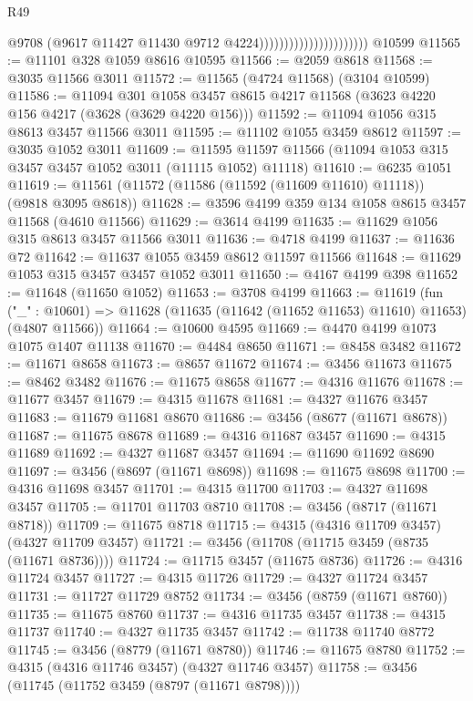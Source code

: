 \begin{lexlean}{R49}
\begin{coremodule}
                                              @9708
                                              (@9617 @11427 @11430 @9712 @4224))))))))))))))))))))))
    @10599
@11565 := @11101 @328 @1059 @8616 @10595
@11566 := @2059 @8618
@11568 := @3035 @11566 @3011
@11572 := @11565 (@4724 @11568) (@3104 @10599)
@11586 := @11094
    @301
    @1058
    @3457
    @8615
    @4217
    @11568
    (@3623 @4220 @156 @4217 (@3628 (@3629 @4220 @156)))
@11592 := @11094 @1056 @315 @8613 @3457 @11566 @3011
@11595 := @11102 @1055 @3459 @8612
@11597 := @3035 @1052 @3011
@11609 := @11595 @11597 @11566 (@11094 @1053 @315 @3457 @3457 @1052 @3011 (@11115 @1052) @11118)
@11610 := @6235 @1051
@11619 := @11561 (@11572 (@11586 (@11592 (@11609 @11610) @11118)) (@9818 @3095 @8618))
@11628 := @3596 @4199 @359 @134 @1058 @8615 @3457 @11568 (@4610 @11566)
@11629 := @3614 @4199
@11635 := @11629 @1056 @315 @8613 @3457 @11566 @3011
@11636 := @4718 @4199
@11637 := @11636 @72
@11642 := @11637 @1055 @3459 @8612 @11597 @11566
@11648 := @11629 @1053 @315 @3457 @3457 @1052 @3011
@11650 := @4167 @4199 @398
@11652 := @11648 (@11650 @1052)
@11653 := @3708 @4199
@11663 := @11619
    (fun ("_" : @10601) => @11628 (@11635 (@11642 (@11652 @11653) @11610) @11653) (@4807 @11566))
@11664 := @10600 @4595
@11669 := @4470 @4199 @1073 @1075 @1407 @11138
@11670 := @4484 @8650
@11671 := @8458 @3482
@11672 := @11671 @8658
@11673 := @8657 @11672
@11674 := @3456 @11673
@11675 := @8462 @3482
@11676 := @11675 @8658
@11677 := @4316 @11676
@11678 := @11677 @3457
@11679 := @4315 @11678
@11681 := @4327 @11676 @3457
@11683 := @11679 @11681 @8670
@11686 := @3456 (@8677 (@11671 @8678))
@11687 := @11675 @8678
@11689 := @4316 @11687 @3457
@11690 := @4315 @11689
@11692 := @4327 @11687 @3457
@11694 := @11690 @11692 @8690
@11697 := @3456 (@8697 (@11671 @8698))
@11698 := @11675 @8698
@11700 := @4316 @11698 @3457
@11701 := @4315 @11700
@11703 := @4327 @11698 @3457
@11705 := @11701 @11703 @8710
@11708 := @3456 (@8717 (@11671 @8718))
@11709 := @11675 @8718
@11715 := @4315 (@4316 @11709 @3457) (@4327 @11709 @3457)
@11721 := @3456 (@11708 (@11715 @3459 (@8735 (@11671 @8736))))
@11724 := @11715 @3457 (@11675 @8736)
@11726 := @4316 @11724 @3457
@11727 := @4315 @11726
@11729 := @4327 @11724 @3457
@11731 := @11727 @11729 @8752
@11734 := @3456 (@8759 (@11671 @8760))
@11735 := @11675 @8760
@11737 := @4316 @11735 @3457
@11738 := @4315 @11737
@11740 := @4327 @11735 @3457
@11742 := @11738 @11740 @8772
@11745 := @3456 (@8779 (@11671 @8780))
@11746 := @11675 @8780
@11752 := @4315 (@4316 @11746 @3457) (@4327 @11746 @3457)
@11758 := @3456 (@11745 (@11752 @3459 (@8797 (@11671 @8798))))

\end{coremodule}
\end{lexlean}
